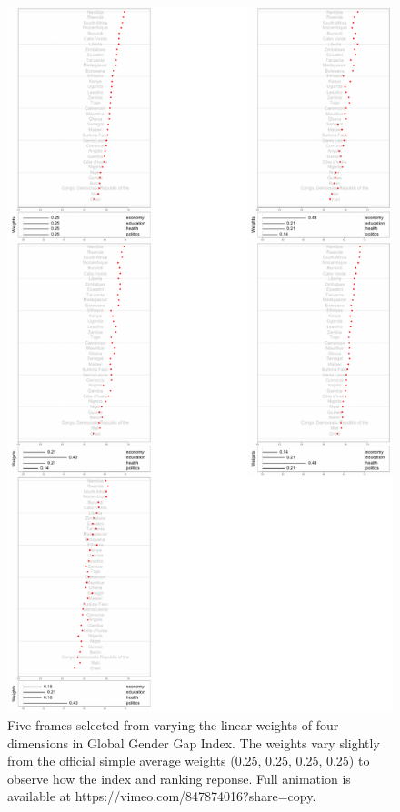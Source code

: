\documentclass[
]{interact}
\begin{document}
\begin{figure}

{\centering \includegraphics{tidyindex_files/figure-pdf/fig-idx-tour-1.pdf}

}

\caption{\label{fig-idx-tour}Five frames selected from varying the
linear weights of four dimensions in Global Gender Gap Index. The
weights vary slightly from the official simple average weights (0.25,
0.25, 0.25, 0.25) to observe how the index and ranking reponse. Full
animation is available at https://vimeo.com/847874016?share=copy.}

\end{figure}
\end{document}
